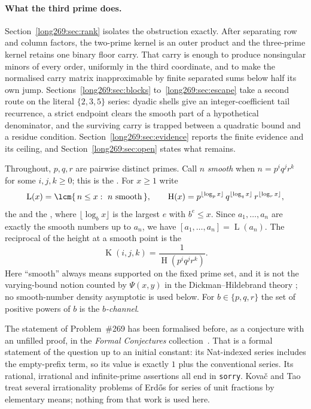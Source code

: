\documentclass[11pt]{article}
\newcommand{\hgt}{\operatorname{H}}
\newcommand{\Lprefix}{\operatorname{L}}
\newcommand{\Kernel}{\operatorname{K}}
\begin{document}
\paragraph{What the third prime does.}
Section~\ref{long269:sec:rank} isolates the obstruction exactly.  After separating row
and column factors, the two-prime kernel is an outer product and the
three-prime kernel retains one binary floor carry.  That carry is enough to
produce nonsingular minors of every order, uniformly in the third coordinate,
and to make the normalised carry matrix inapproximable by finite separated sums
below half its own jump.  Sections~\ref{long269:sec:blocks} to~\ref{long269:sec:escape} take a
second route on the literal $\{2,3,5\}$ series: dyadic shells give an
integer-coefficient tail recurrence, a strict endpoint clears the smooth part
of a hypothetical denominator, and the surviving carry is trapped between a
quadratic bound and a residue condition.  Section~\ref{long269:sec:evidence} reports
the finite evidence and its ceiling, and Section~\ref{long269:sec:open} states what
remains.

Throughout, $p,q,r$ are pairwise distinct primes.  Call $n$ \emph{smooth} when
$n=p^{i}q^{j}r^{k}$ for some $i,j,k\ge0$; this is the
.  For $x\ge1$ write
\[
 \Lprefix(x)=\lcm\{\,n\le x:\ n\ \text{smooth}\,\},
 \qquad
 \hgt(x)=p^{\lfloor\log_p x\rfloor}\,q^{\lfloor\log_q x\rfloor}\,
 r^{\lfloor\log_r x\rfloor},
\]
the
 and the
, where $\lfloor\log_b x\rfloor$ is the largest $e$ with $b^{e}\le x$.
Since $a_1,\ldots,a_n$ are exactly the smooth numbers up to $a_n$, we have
$[a_1,\ldots,a_n]=\Lprefix(a_n)$.  The reciprocal of the height at a smooth
point is the
\[
 \Kernel(i,j,k)=\frac{1}{\hgt(p^{i}q^{j}r^{k})} .
\]
Here ``smooth'' always means supported on the fixed prime set, and it is not
the varying-bound notion counted by $\Psi(x,y)$ in the Dickman--Hildebrand
theory \cite[Theorem~1]{hildebrand1986}; no smooth-number density asymptotic is
used below.  For $b\in\{p,q,r\}$ the set of positive powers of $b$ is the
\emph{$b$-channel}.

The statement of Problem~\#269 has been formalised before, as a conjecture with
an unfilled proof, in the \emph{Formal Conjectures}
collection~\cite{formalconjectures269}.  That is a formal statement of the
question up to an initial constant: its Nat-indexed series includes the
empty-prefix term, so its value is exactly \(1\) plus the conventional series.
Its rational, irrational and infinite-prime
assertions all end in \texttt{sorry}.  Kova\v{c} and Tao~\cite{kovactao2024}
treat several irrationality problems of Erd\H{o}s for series of unit fractions
by elementary means; nothing from that work is used here.
\end{document}
